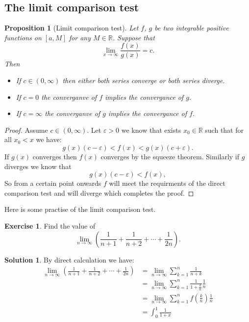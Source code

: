 \documentclass[11pt,a4paper]{article}
\theoremstyle{definition}
\newtheorem*{solution}{Solution}
\newtheorem{exercise}{Exercise}[section]
\theoremstyle{plain}
\newtheorem{proposition}[theorem]{Proposition}
\newcommand{\R}{\mathbb{R}}
\begin{document}
	\newpage
	
  \subsection{The limit comparison test}

  \begin{proposition}[Limit comparison test]
    Let $f$, $g$ be two integrable positive functions on $[a,M]$ for any 
    $M \in \R$. Suppose that
    \[
      \lim_{x\to\infty} \frac{f(x)}{g(x)} = c.
    \]
    Then
    \begin{itemize}
      \item If $c \in (0,\infty)$ then either both series converge or both 
        series diverge.
      \item If $c = 0$ the converganve of $f$ implies the convergance of $g$.
      \item If $c = \infty$ the converganve of $g$ implies the convergance 
        of $f$.
    \end{itemize}
  \end{proposition}
  \begin{proof}
    Assume $c \in (0,\infty)$.
    Let $\varepsilon > 0$ we know that exists $x_0 \in \R$ such that for all 
    $x_0 < x$ we have:
    \[
      g(x)(c - \varepsilon) < f(x) < g(x)(c + \varepsilon).
    \]
    If $g(x)$ converges then $f(x)$ converges by the squeeze theorem.
    Similarly if $g$ diverges we know that
    \[
      g(x)(c - \varepsilon) < f(x),
    \]
    So from a certain point onwards $f$ will meet the requirments of the 
    direct comparison test and will diverge which completes the proof.
  \end{proof}
  
  Here is some practise of the limit comparison test.

  \begin{exercise}
    Find the value of
    \[
      \lim_{n\to\infty}
      \left(\frac 1{n+1} + \frac 1{n+2} + \cdots + \frac {1}{2n}\right).
    \]
  \end{exercise}
  \begin{solution}
    By direct calculation we have:
    \begin{align*}
    \lim_{n\to\infty}
    {\left(\frac {1}{n+1} + \frac {1}{n+2} + \cdots + \frac {1}{2n}\right)} 
    &= \lim_{n\to\infty}
    {\sum_{k=1}^{n}{\frac {1}{n+k}}} 
    \\
    &= \lim_{n\to\infty}
    {\sum_{k=1}^{n}{\frac {1}{1 + \frac {k}{n}}\frac {1}{n}}} 
    \\
    &= \lim_{n\to\infty}
    {\sum_{k=1}^{n} {f(\frac {k}{n})\frac {1}{n}}} 
    \\
    &= \int_{0}^{1}{\frac{1}{1+x}}
    \end{align*}
  \end{solution}
	
\end{document}

